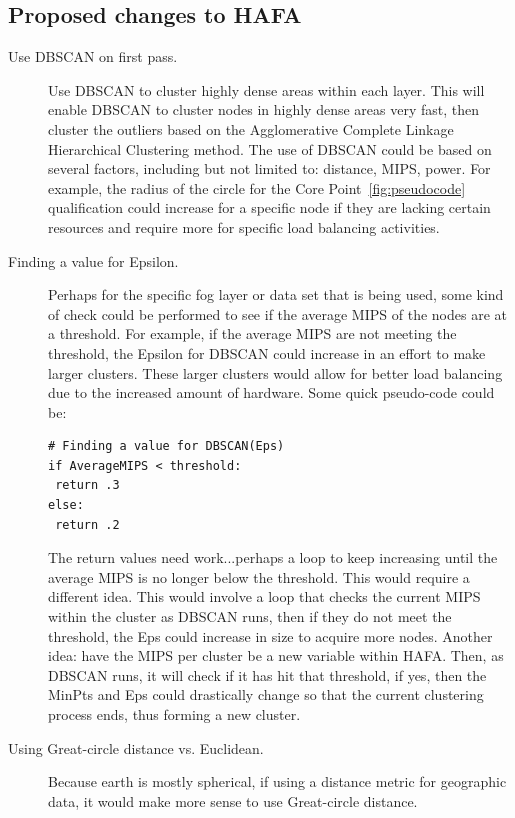 \documentclass[letterpaper,twocolumn,10pt]{article}
\begin{document}
\subsection{Proposed changes to HAFA}
\begin{description}
\item[Use DBSCAN on first pass.] Use DBSCAN to cluster highly dense areas within each layer. This will enable DBSCAN to cluster nodes in highly dense areas very fast, then cluster the outliers based on the Agglomerative Complete Linkage Hierarchical Clustering method. The use of DBSCAN could be based on several factors, including but not limited to: distance, MIPS, power. For example, the radius of the circle for the Core Point~\ref{fig:pseudocode} qualification could increase for a specific node if they are lacking certain resources and require more for specific load balancing activities.

\item[Finding a value for Epsilon.] Perhaps for the specific fog layer or data set that is being used, some kind of check could be performed to see if the average MIPS of the nodes are at a threshold. For example, if the average MIPS are not meeting the threshold, the Epsilon for DBSCAN could increase in an effort to make larger clusters. These larger clusters would allow for better load balancing due to the increased amount of hardware. Some quick pseudo-code could be:
\begin{verbatim}
# Finding a value for DBSCAN(Eps)
if AverageMIPS < threshold:
 return .3
else:
 return .2
\end{verbatim}
 The return values need work...perhaps a loop to keep increasing until the average MIPS is no longer below the threshold. This would require a different idea. This would involve a loop that checks the current MIPS within the cluster as DBSCAN runs, then if they do not meet the threshold, the Eps could increase in size to acquire more nodes. Another idea: have the MIPS per cluster be a new variable within HAFA. Then, as DBSCAN runs, it will check if it has hit that threshold, if yes, then the MinPts and Eps could drastically change so that the current clustering process ends, thus forming a new cluster.
 
 \item[Using Great-circle distance vs. Euclidean.] Because earth is mostly spherical, if using a distance metric for geographic data, it would make more sense to use Great-circle distance.
\end{description}
\end{document}
